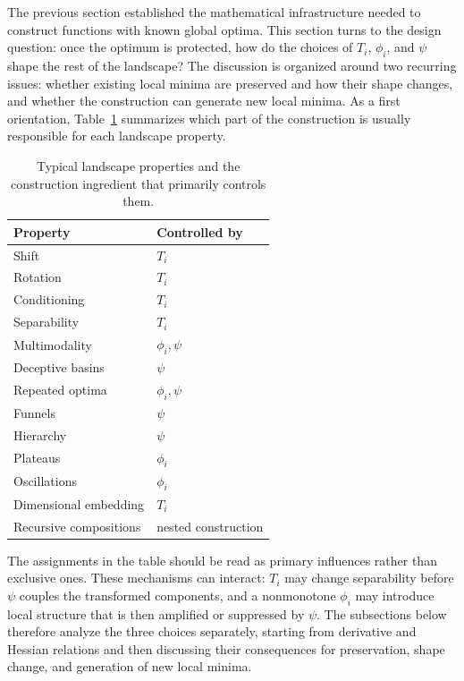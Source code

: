 \documentclass[journal]{IEEEtran}
\theoremstyle{remark}
\theoremstyle{plain}
\begin{document}
The previous section established the mathematical infrastructure needed to
construct functions with known global optima. This section turns to the design
question: once the optimum is protected, how do the choices of \(T_i\),
\(\phi_i\), and \(\psi\) shape the rest of the landscape? The discussion is
organized around two recurring issues: whether existing local minima are
preserved and how their shape changes, and whether the construction can generate
new local minima. As a first orientation, Table~\ref{tab:property-control}
summarizes which part of the construction is usually responsible for each
landscape property.

\begin{table}[t]
	\centering
	\caption{Typical landscape properties and the construction ingredient that
	primarily controls them.}
	\label{tab:property-control}
	\begin{tabular}{ll}
		\hline
		Property & Controlled by \\
		\hline
		Shift & \(T_i\) \\
		Rotation & \(T_i\) \\
		Conditioning & \(T_i\) \\
		Separability & \(T_i\) \\
		Multimodality & \(\phi_i,\psi\) \\
		Deceptive basins & \(\psi\) \\
		Repeated optima & \(\phi_i,\psi\) \\
		Funnels & \(\psi\) \\
		Hierarchy & \(\psi\) \\
		Plateaus & \(\phi_i\) \\
		Oscillations & \(\phi_i\) \\
		Dimensional embedding & \(T_i\) \\
		Recursive compositions & nested construction \\
		\hline
	\end{tabular}
\end{table}

The assignments in the table should be read as primary influences rather than
exclusive ones. These mechanisms can interact: \(T_i\) may change separability
before \(\psi\) couples the transformed components, and a nonmonotone
\(\phi_i\) may introduce local structure that is then amplified or suppressed
by \(\psi\). The subsections below therefore analyze the three choices
separately, starting from derivative and Hessian relations and then discussing
their consequences for preservation, shape change, and generation of new local
minima.
\end{document}
